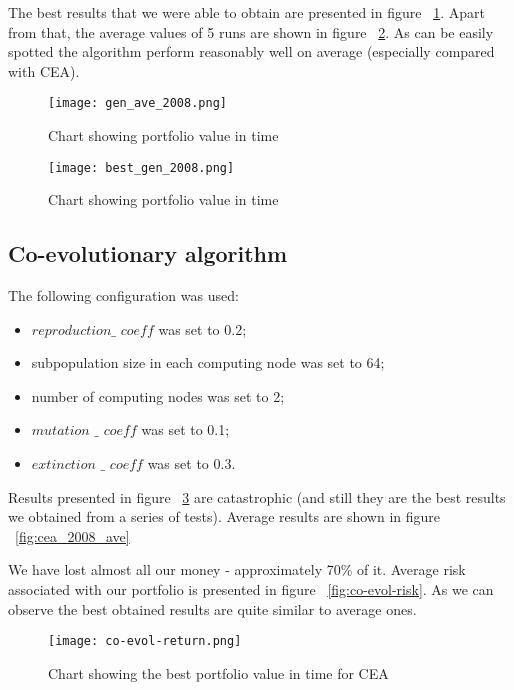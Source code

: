 The best results that we were able to obtain are presented in figure ~\ref{fig:gen_ave_2008}.
Apart from that, the average values of 5 runs are shown in figure ~\ref{fig:gen_best_2008}.
As can be easily spotted the algorithm perform reasonably well on average (especially compared with CEA).

\begin{figure}[ht]
  \begin{center}
    \texttt{[image: gen\_ave\_2008.png]}
  \end{center}
  \caption{Chart showing portfolio value in time}
  \label{fig:gen_ave_2008}
\end{figure}

\begin{figure}[ht]
  \begin{center}
    \texttt{[image: best\_gen\_2008.png]}
  \end{center}
  \caption{Chart showing portfolio value in time}
  \label{fig:gen_best_2008}
\end{figure}

\subsection{Co-evolutionary algorithm}

The following configuration was used:
\begin{itemize}
  \item $reproduction\_$ $coeff$ was set to 0.2;
  \item subpopulation size in each computing node was set to 64;
  \item number of computing nodes was set to 2;
  \item $mutation$ $\_$ $coeff$ was set to 0.1;
  \item $extinction$ $\_$ $coeff$ was set to 0.3.
\end{itemize}

Results presented in figure ~\ref{fig:co_evol_return} are catastrophic (and still they are the best results we obtained from a series of tests).
Average results are shown in figure ~\ref{fig:cea_2008_ave}

We have lost almost all our money - approximately 70\% of it.
Average risk associated with our portfolio is presented in figure ~\ref{fig:co-evol-risk}.
As we can observe the best obtained results are quite similar to average ones.

\begin{figure}[ht]
  \begin{center}
    \texttt{[image: co-evol-return.png]}
  \end{center}
  \caption{Chart showing the best portfolio value in time for CEA}
  \label{fig:co_evol_return}
\end{figure}

